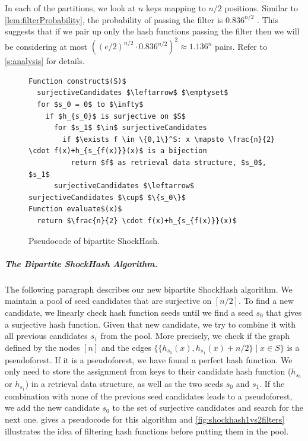 \documentclass[a4paper,USenglish,cleveref]{lipics-v2021}
\newcommand{\myparagraph}[1]{\subparagraph*{#1}}
\begin{document}
\label{s:filterEffectiveness}
In each of the partitions, we look at $n$ keys mapping to $n/2$ positions.
Similar to \cref{lem:filterProbability}, the probability of passing the filter is $0.836^{n/2}$ \cite{walzer2024probability}.
This suggests that if we pair up only the hash functions passing the filter then we will be considering at most $((e/2)^{n/2} \cdot 0.836^{n/2})^2 \approx 1.136^n$ pairs.
Refer to \cref{s:analysis} for details.

\begin{figure}[t]
      \begin{lstlisting}
Function construct$(S)$
  surjectiveCandidates $\leftarrow$ $\emptyset$
  for $s_0 = 0$ to $\infty$
    if $h_{s_0}$ is surjective on $S$
      for $s_1$ $\in$ surjectiveCandidates
        if $\exists f \in \{0,1\}^S: x \mapsto \frac{n}{2} \cdot f(x)+h_{s_{f(x)}}(x)$ is a bijection
          return $f$ as retrieval data structure, $s_0$, $s_1$
      surjectiveCandidates $\leftarrow$ surjectiveCandidates $\cup$ $\{s_0\}$
Function evaluate$(x)$
  return $\frac{n}{2} \cdot f(x)+h_{s_{f(x)}}(x)$
      \end{lstlisting}
  \caption{Pseudocode of bipartite ShockHash.}
  \label{fig:pseudocode}
\end{figure}

\myparagraph{The Bipartite ShockHash Algorithm.}
The following paragraph describes our new bipartite ShockHash algorithm.
We maintain a pool of seed candidates that are surjective on $[n/2]$.
To find a new candidate, we linearly check hash function seeds until we find a seed $s_0$ that gives a surjective hash function.
Given that new candidate, we try to combine it with all previous candidates $s_1$ from the pool.
More precisely, we check if the graph defined by the nodes $[n]$ and the edges $\{\{h_{s_0}(x), h_{s_1}(x) + n/2\} \mid x \in S\}$ is a pseudoforest.
If it is a pseudoforest, we have found a perfect hash function.
We only need to store the assignment from keys to their candidate hash function ($h_{s_0}$ or $h_{s_1}$) in a retrieval data structure, as well as the two seeds $s_0$ and $s_1$.
If the combination with none of the previous seed candidates leads to a pseudoforest, we add the new candidate $s_0$ to the set of surjective candidates and search for the next one.
 gives a pseudocode for this algorithm and \cref{fig:shockhash1vs2filters} illustrates the idea of filtering hash functions before putting them in the pool.
\end{document}
